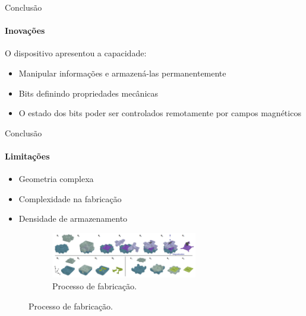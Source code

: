 \begin{frame}[t]{Conclusão}
    \transboxout[duration=0.5]
    \framesubtitle{Inovações} 

O dispositivo apresentou a capacidade:
\begin{itemize}
    \item Manipular informações e armazená-las permanentemente
    \item Bits definindo propriedades mecânicas
    \item O estado dos bits poder ser controlados remotamente por campos magnéticos 
\end{itemize}
\end{frame}



\begin{frame}[t]{Conclusão}
    \transboxout[duration=0.5]
    \framesubtitle{Limitações} 
    \begin{itemize}
        \item Geometria complexa
        \item Complexidade na fabricação
        \item Densidade de armazenamento
    \end{itemize}
    \begin{figure}
        \begin{figure}[H]
            \centering
            \includegraphics[width = 0.7\textwidth]{source/pictures/fabrication.png}
            \caption{Processo de fabricação\cite{chen2021reprogrammable}.}
            \label{fig:uba-fabrication}
        \end{figure}
    \end{figure}
    \small
\end{frame}



